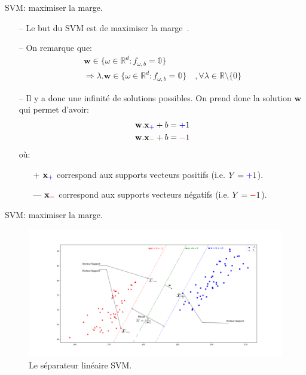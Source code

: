 \documentclass[9pt]{beamer}
\begin{document}
	\begin{frame}{SVM\@: maximiser la marge.}
		\begin{itemize}
			\item[--] Le but du SVM est de maximiser la marge~\cite{vapnik1998statistical}.
			\item[--] On remarque que:
			\begin{gather*}
				\textbf{w} \in \{\omega \in \mathbb{R}^d : f_{\omega, b} = \mathbb{0}\} \\
				\Rightarrow
				\lambda . \textbf{w} \in \{\omega \in \mathbb{R}^d : f_{\omega, b} = \mathbb{0}\}\quad, \forall \lambda \in \mathbb{R}\setminus\{0\}
			\end{gather*}
			\item[--] Il y a donc une infinité de solutions possibles. On prend donc la solution $\textbf{w}$ qui permet d'avoir:
			\begin{align}
				\textbf{w}.\textbf{x}_{\color{blue}+} + b &= {\color{blue}+}1 \\
				\textbf{w}.\textbf{x}_{\color{red}-} + b &= {\color{red}-}1
			\end{align}
			où:
			\begin{itemize}
				\item[{\color{blue}+}] $\textbf{x}_{\color{blue}+}$ correspond aux supports vecteurs positifs (i.e. $Y={\color{blue}+}1$).
				\item[{\color{red}---}] $\textbf{x}_{\color{red}-}$ correspond aux supports vecteurs négatifs (i.e. $Y={\color{red}-}1$).
			\end{itemize}
		\end{itemize}
	\end{frame}

	\begin{frame}{SVM\@: maximiser la marge.}
		\begin{figure}[H]
			\includegraphics[width=\textwidth]{svm_margin}
			\caption{\label{fig::margin} Le séparateur linéaire SVM.}
		\end{figure}
	\end{frame}
\end{document}
